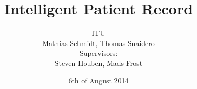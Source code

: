 \documentclass[a4paper,12pt]{article}
\title{Intelligent Patient Record}
\author{ITU \\
\vspace{5mm}
Mathias Schmidt, Thomas Snaidero \\
Supervisors: \\
Steven Houben, Mads Frost}
\date{6th of August 2014}
\begin{document}
\maketitle
\pagebreak
\tableofcontents
\pagebreak








%





%







% 

% 

% 

% 

\clearpage



\end{document}
